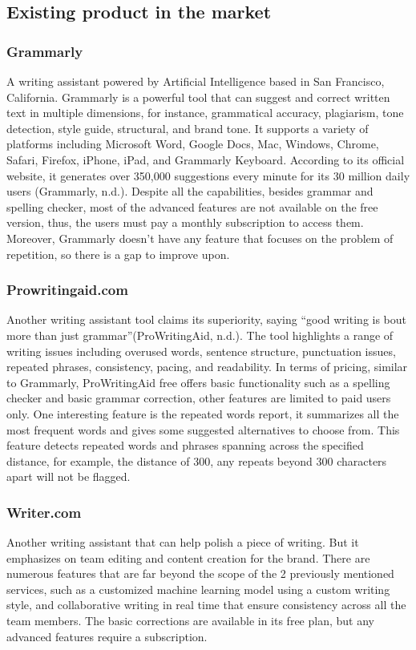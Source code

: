 \documentclass[12pt,oneside,openright,a4paper]{cpe-english-project}
\begin{document}
\subsection{Existing product in the market}

\subsubsection{Grammarly} 
A writing assistant powered by Artificial Intelligence based in San Francisco, California. Grammarly is a powerful tool that can suggest and correct written text in multiple dimensions, for instance, grammatical accuracy, plagiarism, tone detection, style guide, structural, and brand tone. It supports a variety of platforms including Microsoft Word, Google Docs, Mac, Windows, Chrome, Safari, Firefox, iPhone, iPad, and Grammarly Keyboard. According to its official website,  it generates over 350,000 suggestions every minute for its 30 million daily users (Grammarly, n.d.). Despite all the capabilities, besides grammar and spelling checker, most of the advanced features are not available on the free version, thus, the users must pay a monthly subscription to access them. Moreover, Grammarly doesn’t have any feature that focuses on the problem of repetition, so there is a gap to improve upon\cite{h}. 
\subsubsection{Prowritingaid.com} Another writing assistant tool claims its superiority, saying “good writing is bout more than just grammar”(ProWritingAid, n.d.). The tool highlights a range of writing issues including overused words, sentence structure, punctuation issues, repeated phrases, consistency, pacing, and readability. In terms of pricing, similar to Grammarly, ProWritingAid free offers basic functionality such as a spelling checker and basic grammar correction, other features are limited to paid users only. One interesting feature is the repeated words report, it summarizes all the most frequent words and gives some suggested alternatives to choose from. This feature detects repeated words and phrases spanning across the specified distance, for example, the distance of 300, any repeats beyond 300 characters apart will not be flagged\cite{g}. 

\subsubsection{Writer.com} Another writing assistant that can help polish a piece of writing. But it emphasizes on team editing and content creation for the brand. There are numerous features that are far beyond the scope of the 2 previously mentioned services, such as a customized machine learning model using a custom writing style, and collaborative writing in real time that ensure consistency across all the team members. The basic corrections are available in its free plan, but any advanced features require a subscription\cite{i}.
\end{document}
